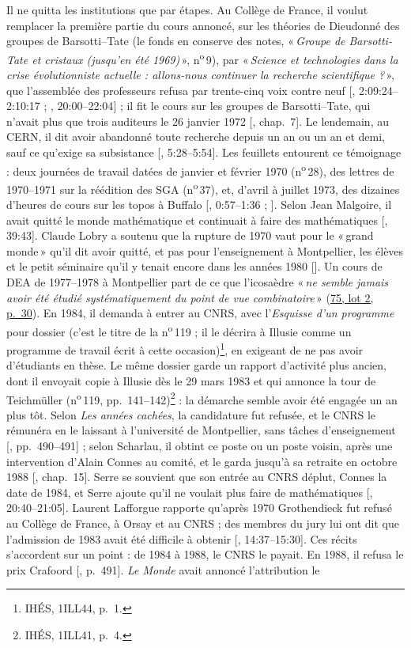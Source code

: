 \documentclass[11pt]{amsart}
\makeatletter
\newcommand{\ts}[1]{\foreignlanguage{english}{#1}}
\newcommand{\q}[1]{«\,\textit{#1}\,»}
\newcommand{\mot}[1]{«\,#1\,»}
\newcommand{\cote}[1]{\mbox{n\textsuperscript{o}\,#1}}
\def\RHM@first#1--#2\@nil{#1}
\DeclareRobustCommand{\lot}[3]{\begingroup\edef\RHM@pdfpage{\the\numexpr\RHM@first#3--\@nil+1\relax}\href{https://grothendieck.umontpellier.fr/#1.pdf\#page=\RHM@pdfpage}{#1, lot #2, p.~#3}\endgroup}
\newcommand{\lot}[3]{\href{https://grothendieck.commutator.io/\##1/#2/p#3}{#1, lot #2, p.~#3}}
\makeatother
\begin{document}
Il ne quitta les institutions que par étapes. Au Collège de France, il voulut remplacer la première partie du cours annoncé, sur les théories de Dieudonné des groupes de Barsotti--Tate (le fonds en conserve des notes, \q{Groupe de Barsotti-Tate et cristaux (jusqu'en été 1969)}, \cote{9}), par \q{Science et technologies dans la crise évolutionniste actuelle : allons-nous continuer la recherche scientifique ?}, que l'assemblée des professeurs refusa par trente-cinq voix contre neuf [\citealp{grothendieck1972}, \ts{2:09:24--2:10:17} ; \citealp{serreconnes2019}, \ts{20:00--22:04}] ; il fit le cours sur les groupes de Barsotti--Tate, qui n'avait plus que trois auditeurs le 26 janvier 1972 [\citealp{circle-spirit}, chap.~7]. Le lendemain, au CERN, il dit avoir abandonné toute recherche depuis un an ou un an et demi, sauf ce qu'exige sa subsistance [\citealp{grothendieck1972}, \ts{5:28--5:54}]. Les feuillets entourent ce témoignage : deux journées de travail datées de janvier et février 1970 (\cote{28}), des lettres de 1970--1971 sur la réédition des SGA (\cote{37}), et, d'avril à juillet 1973, des dizaines d'heures de cours sur les topos à Buffalo [\citealp{mclarty2018}, \ts{0:57--1:36} ; \citealp{buffalo1973topos}]. Selon Jean Malgoire, il avait quitté le monde mathématique et continuait à faire des mathématiques [\citealp{malgoire2017a}, \ts{39:43}]. Claude Lobry a soutenu que la rupture de 1970 vaut pour le \mot{grand monde} qu'il dit avoir quitté, et pas pour l'enseignement à Montpellier, les élèves et le petit séminaire qu'il y tenait encore dans les années 1980 [\citealp{lobry2019}]. Un cours de DEA de 1977--1978 à Montpellier part de ce que l'icosaèdre \q{ne semble jamais avoir été étudié systématiquement du point de vue combinatoire} (\lot{75}{2}{30}). En 1984, il demanda à entrer au CNRS, avec l'\emph{Esquisse d'un programme} pour dossier (c'est le titre de la \cote{119} ; il le décrira à Illusie comme un programme de travail écrit à cette occasion)\footnote{IHÉS, 1ILL44, p.~1.}, en exigeant de ne pas avoir d'étudiants en thèse. Le même dossier garde un rapport d'activité plus ancien, dont il envoyait copie à Illusie dès le 29 mars 1983 et qui annonce la tour de Teichmüller (\cote{119}, pp.~141--142)\footnote{IHÉS, 1ILL41, p.~4.} : la démarche semble avoir été engagée un an plus tôt. Selon \emph{Les années cachées}, la candidature fut refusée, et le CNRS le rémunéra en le laissant à l'université de Montpellier, sans tâches d'enseignement [\citealp{grothendieck2025}, pp.~490--491] ; selon Scharlau, il obtint ce poste ou un poste voisin, après une intervention d'Alain Connes au comité, et le garda jusqu'à sa retraite en octobre 1988 [\citealp{circle-spirit}, chap.~15]. Serre se souvient que son entrée au CNRS déplut, Connes la date de 1984, et Serre ajoute qu'il ne voulait plus faire de mathématiques [\citealp{serreconnes2019}, \ts{20:40--21:05}]. Laurent Lafforgue rapporte qu'après 1970 Grothendieck fut refusé au Collège de France, à Orsay et au CNRS ; des membres du jury lui ont dit que l'admission de 1983 avait été difficile à obtenir [\citealp{lafforgue2019}, \ts{14:37--15:30}]. Ces récits s'accordent sur un point : de 1984 à 1988, le CNRS le payait. En 1988, il refusa le prix Crafoord [\citealp{grothendieck2025}, p.~491]. \emph{Le Monde} avait annoncé l'attribution le 
\end{document}
